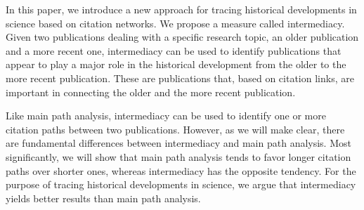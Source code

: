 \documentclass[9pt,twocolumn,twoside]{pnas-alt} %
\theoremstyle{definition}
\begin{document}
In this paper, we introduce a new approach for tracing historical developments in science based on citation networks. We propose a measure called intermediacy. Given two publications dealing with a specific research topic, an older publication and a more recent one, intermediacy can be used to identify publications that appear to play a major role in the historical development from the older to the more recent publication. These are publications that, based on citation links, are important in connecting the older and the more recent publication.

Like main path analysis, intermediacy can be used to identify one or more citation paths between two publications. However, as we will make clear, there are fundamental differences between intermediacy and main path analysis. Most significantly, we will show that main path analysis tends to favor longer citation paths over shorter ones, whereas intermediacy has the opposite tendency. For the purpose of tracing historical developments in science, we argue that intermediacy yields better results than main path analysis.

\end{document}

